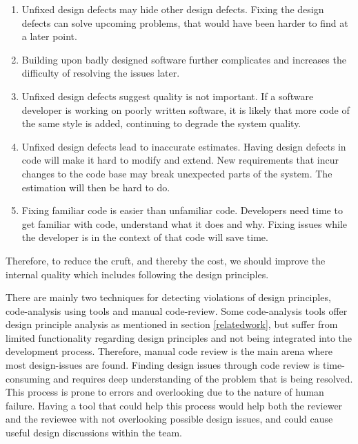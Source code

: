 \documentclass{report}
\begin{document}
\begin{enumerate}
    \item Unfixed design defects may hide other design defects. Fixing the design defects can solve upcoming problems, that would have been harder to find at a later point.
    \item Building upon badly designed software further complicates and increases the difficulty of resolving the issues later.
    \item Unfixed design defects suggest quality is not important. If a software developer is working on poorly written software, it is likely that more code of the same style is added, continuing to degrade the system quality.
    \item Unfixed design defects lead to inaccurate estimates. Having design defects in code will make it hard to modify and extend. New requirements that incur changes to the code base may break unexpected parts of the system. The estimation will then be hard to do.
    \item Fixing familiar code is easier than unfamiliar code. Developers need time to get familiar with code, understand what it does and why. Fixing issues while the developer is in the context of that code will save time.
\end{enumerate}

Therefore, to reduce the cruft, and thereby the cost, we should improve the internal quality which includes following the design principles.




There are mainly two techniques for detecting violations of design principles, code-analysis using tools and manual code-review. Some code-analysis tools offer design principle analysis as mentioned in section \ref{relatedwork}, but suffer from limited functionality regarding design principles and not being integrated into the development process. Therefore, manual code review is the main arena where most design-issues are found. Finding design issues through code review is time-consuming and requires deep understanding of the problem that is being resolved. This process is prone to errors and overlooking due to the nature of human failure. Having a tool that could help this process would help both the reviewer and the reviewee with not overlooking possible design issues, and could cause useful design discussions within the team.
\end{document}
